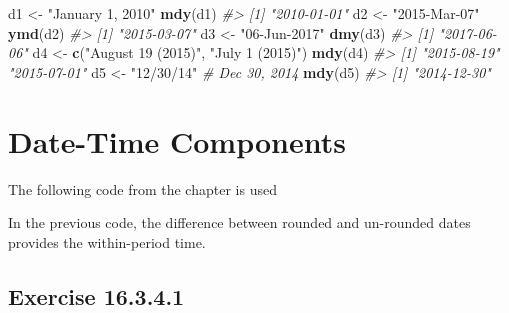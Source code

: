 \documentclass[]{book}
\newenvironment{Shaded}{\begin{snugshade}}{\end{snugshade}}
\newcommand{\CommentTok}[1]{\textcolor[rgb]{0.56,0.35,0.01}{\textit{#1}}}
\newcommand{\DataTypeTok}[1]{\textcolor[rgb]{0.13,0.29,0.53}{#1}}
\newcommand{\KeywordTok}[1]{\textcolor[rgb]{0.13,0.29,0.53}{\textbf{#1}}}
\newcommand{\NormalTok}[1]{#1}
\newcommand{\OperatorTok}[1]{\textcolor[rgb]{0.81,0.36,0.00}{\textbf{#1}}}
\newcommand{\OtherTok}[1]{\textcolor[rgb]{0.56,0.35,0.01}{#1}}
\newcommand{\StringTok}[1]{\textcolor[rgb]{0.31,0.60,0.02}{#1}}
\theoremstyle{plain}
\theoremstyle{remark}
\begin{document}
\begin{Shaded}
\begin{Highlighting}[]
\NormalTok{d1 <-}\StringTok{ "January 1, 2010"}
\KeywordTok{mdy}\NormalTok{(d1)}
\CommentTok{#> [1] "2010-01-01"}
\NormalTok{d2 <-}\StringTok{ "2015-Mar-07"}
\KeywordTok{ymd}\NormalTok{(d2)}
\CommentTok{#> [1] "2015-03-07"}
\NormalTok{d3 <-}\StringTok{ "06-Jun-2017"}
\KeywordTok{dmy}\NormalTok{(d3)}
\CommentTok{#> [1] "2017-06-06"}
\NormalTok{d4 <-}\StringTok{ }\KeywordTok{c}\NormalTok{(}\StringTok{"August 19 (2015)"}\NormalTok{, }\StringTok{"July 1 (2015)"}\NormalTok{)}
\KeywordTok{mdy}\NormalTok{(d4)}
\CommentTok{#> [1] "2015-08-19" "2015-07-01"}
\NormalTok{d5 <-}\StringTok{ "12/30/14"} \CommentTok{# Dec 30, 2014}
\KeywordTok{mdy}\NormalTok{(d5)}
\CommentTok{#> [1] "2014-12-30"}
\end{Highlighting}
\end{Shaded}

\hypertarget{date-time-components}{%
\section{Date-Time Components}\label{date-time-components}}

The following code from the chapter is used

\begin{Shaded}
\end{Shaded}

In the previous code, the difference between rounded and un-rounded
dates provides the within-period time.

\hypertarget{exercise-16.3.4.1}{%
\subsection*{\texorpdfstring{Exercise
{16.3.4.1}}{Exercise 16.3.4.1}}\label{exercise-16.3.4.1}}
\end{document}

